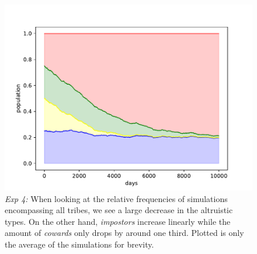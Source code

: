 \documentclass[sigconf]{acmart}
\newcommand{\cowards}{\textit{cowards}\xspace}
\newcommand{\impostors}{\textit{impostors}\xspace}
\begin{document}
    \begin{figure}[t]
        \includegraphics[width=\columnwidth]{figures/exp4_impostor_rel}
        \caption{\textit{Exp 4:} When looking at the relative frequencies of simulations encompassing all tribes, we see a large decrease in the altruistic types.
        On the other hand, \impostors increase linearly while the amount of \cowards only drops by around one third.
        Plotted is only the average of the simulations for brevity.}
        \label{fig:exp4_impostor_rel}
    \end{figure}
\end{document}
